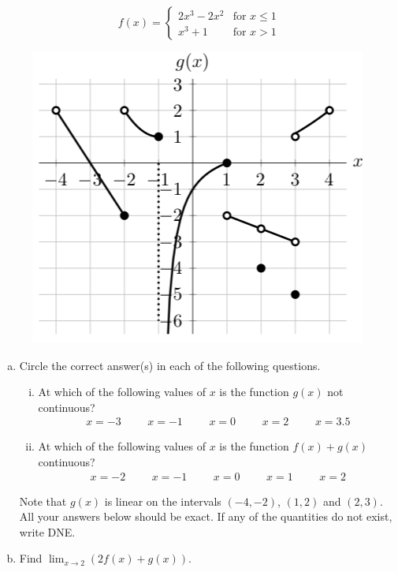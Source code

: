 \documentclass[11pt]{exam}
\begin{document}
\begin{questions}
$$f(x) = \left\lbrace \begin{array}{ll} 2x^3-2x^2 & \textrm{for } x \leqslant 1 \\x^3 + 1 & \textrm{for } x > 1 \end{array} \right.$$

  \begin{figure}[h]
    \centering
    \includegraphics[scale=0.5]{Figures/discontinuities}
  \end{figure}

\begin{enumerate}[(a)]
\item Circle the correct answer(s) in each of the following questions.
\begin{enumerate}[(i)]
\item At which of the following values of $x$ is the function $g(x)$ not continuous?
$$\begin{array}{ccccccccccccc}
x = -3 &&& x = -1 &&& x = 0 &&& x = 2 &&& x = 3.5
\end{array}$$
\item At which of the following values of $x$ is the function $f(x) + g(x)$ continuous?
$$\begin{array}{ccccccccccccc}
x = -2 &&& x = -1 &&& x = 0 &&& x = 1 &&& x = 2
\end{array}$$

\end{enumerate}
Note that $g(x)$ is linear on the intervals $(-4,-2)$, $(1,2)$ and $(2, 3)$. All your answers below should be exact. If any of the quantities do not exist, write DNE.

\item Find $\displaystyle\lim_{x \rightarrow 2} (2f(x)+g(x))$.


\end{enumerate}
\end{questions}
\end{document}
